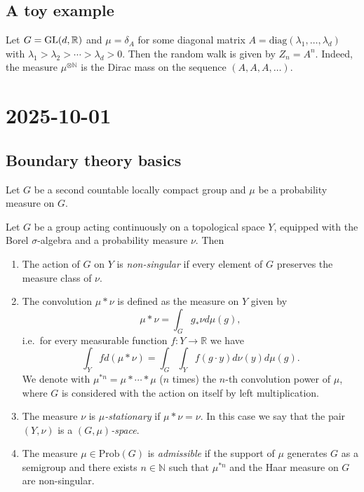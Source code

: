 \documentclass{report}
\begin{document}
\subsection{A toy example}
Let $G = \operatorname{{\mathrm{GL}}}(d,\mathbb R)$ and $\mu = \delta_A$ for some diagonal matrix $A = \mathrm{diag}(\lambda_1, \ldots, \lambda_d)$ with $\lambda_1 > \lambda_2 > \cdots > \lambda_d > 0$.
Then the random walk is given by $Z_n = A^n$.
Indeed, the measure $\mu^{\otimes \mathbb N}$ is the Dirac mass on the sequence $(A, A, A, \ldots)$.
\section{2025-10-01}
\subsection{Boundary theory basics}
\begin{assumption}
    Let $G$ be a second countable locally compact group and $\mu$ be a probability measure on $G$.
\end{assumption}
\begin{definition}
    Let $G$ be a group acting continuously on a topological space $Y$, equipped with the Borel $\sigma$-algebra and a probability measure $\nu$.
    Then
    \begin{enumerate}[label=(\roman*)]
        \item The action of $G$ on $Y$ is \emph{non-singular} if every element of $G$ preserves the measure class of $\nu$.
        \item The convolution $\mu * \nu$ is defined as the measure on $Y$ given by
        \[
        \mu * \nu = \int_G g_* \nu d\mu(g),
        \]
        i.e.\ for every measurable function $f: Y \to \mathbb R$ we have
        \[
        \int_Y f d(\mu * \nu) = \int_G \int_Y f(g \cdot y) d\nu(y) d\mu(g).
        \]
        We denote with $\mu^{*n} = \mu * \cdots * \mu$ ($n$ times) the $n$-th convolution power of $\mu$, where $G$ is considered with the action on itself by left multiplication.
        \item The measure $\nu$ is \emph{$\mu$-stationary} if $\mu * \nu = \nu$. In this case we say that the pair $(Y, \nu)$ is a \emph{$(G, \mu)$-space}.
        \item The measure $\mu \in \mathrm{Prob}(G)$ is \emph{admissible} if the support of $\mu$ generates $G$ as a semigroup and there exists $n \in \mathbb N$ such that $\mu^{*n}$ and the Haar measure on $G$ are non-singular.
    \end{enumerate}
\end{definition}
\end{document}
